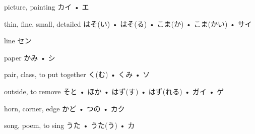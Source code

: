 



\setcounter{cardnum}{81}

		{picture, painting}
		{カイ • エ}
		{}{}
		{}{}
		{}{}
		{}{}
		{}{}

		{thin, fine, small, detailed}
		{はそ(い) • はそ(る) • こま(か) • こま(かい) • サイ}
		{}{}
		{}{}
		{}{}
		{}{}
		{}{}

		{line}
		{セン}
		{}{}
		{}{}
		{}{}
		{}{}
		{}{}

		{paper}
		{かみ • シ}
		{}{}
		{}{}
		{}{}
		{}{}
		{}{}

		{pair, class, to put together}
		{く(む) • くみ • ソ}
		{}{}
		{}{}
		{}{}
		{}{}
		{}{}

		{outside, to remove}
		{そと • ほか • はず(す) • はず(れる) • ガイ • ゲ}
		{}{}
		{}{}
		{}{}
		{}{}
		{}{}

		{horn, corner, edge}
		{かど • つの • カク}
		{}{}
		{}{}
		{}{}
		{}{}
		{}{}

		{song, poem, to sing}
		{うた • うた(う) • カ}
		{}{}
		{}{}
		{}{}
		{}{}
		{}{}

